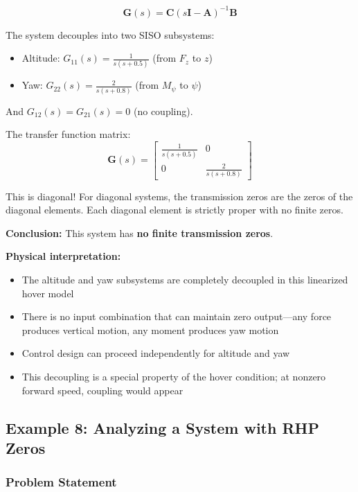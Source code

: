 \begin{equation}
\mathbf{G}(s) = \mathbf{C}(s\mathbf{I} - \mathbf{A})^{-1}\mathbf{B}
\end{equation}

The system decouples into two SISO subsystems:
\begin{itemize}
\item Altitude: $G_{11}(s) = \frac{1}{s(s+0.5)}$ (from $F_z$ to $z$)
\item Yaw: $G_{22}(s) = \frac{2}{s(s+0.8)}$ (from $M_\psi$ to $\psi$)
\end{itemize}

And $G_{12}(s) = G_{21}(s) = 0$ (no coupling).

The transfer function matrix:
\begin{equation}
\mathbf{G}(s) = \begin{bmatrix} \frac{1}{s(s+0.5)} & 0 \\ 0 & \frac{2}{s(s+0.8)} \end{bmatrix}
\end{equation}

This is diagonal! For diagonal systems, the transmission zeros are the zeros of the diagonal elements. Each diagonal element is strictly proper with no finite zeros.

\textbf{Conclusion:} This system has \textbf{no finite transmission zeros}.

\textbf{Physical interpretation:}
\begin{itemize}
\item The altitude and yaw subsystems are completely decoupled in this linearized hover model
\item There is no input combination that can maintain zero output---any force produces vertical motion, any moment produces yaw motion
\item Control design can proceed independently for altitude and yaw
\item This decoupling is a special property of the hover condition; at nonzero forward speed, coupling would appear
\end{itemize}


\subsection{Example 8: Analyzing a System with RHP Zeros}

\subsubsection{Problem Statement}

